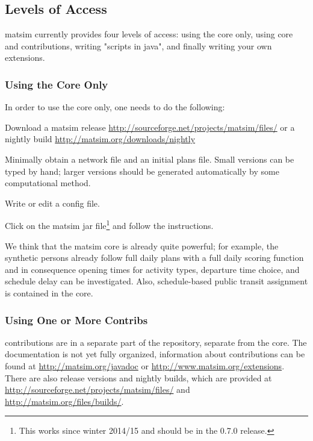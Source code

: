 \subsection{Levels of Access}
\label{sec:levels-of-access}
\gls{matsim} currently provides four levels of access: using the core only, using core and \glspl{contribution}, writing "scripts in \gls{java}", and finally writing your own \glspl{extension}.

\subsubsection{Using the Core Only}
\label{sec:using-core-only}
In order to use the core only, one needs to do the following:
\begin{compactitem}
\item Download a \gls{matsim} release \url{http://sourceforge.net/projects/matsim/files/} or a nightly build \url{http://matsim.org/downloads/nightly} %
\item Minimally obtain a network file and an initial plans file.  Small versions can be typed by hand; larger versions should be generated automatically by some computational method.
\item Write or edit a config file.
\item Click on the \gls{matsim} jar file\footnote{This works since winter 2014/15 and should be in the 0.7.0 release.} and follow the instructions. 
\end{compactitem}
We think that the \gls{matsim} core is already quite powerful; for example, the synthetic persons already follow full daily plans with a full daily scoring function and in consequence opening times for activity types, departure time choice, and schedule delay can be investigated. Also, schedule-based public transit assignment is contained in the core.

\subsubsection{Using One or More Contribs}
\label{sec:using-contribs}
\Glspl{contribution} are in a separate part of the repository, separate from the core.  The documentation is not yet fully organized, information about \glspl{contribution} can be found at \url{http://matsim.org/javadoc} or \url{http://www.matsim.org/extensions}. There are also release versions and nightly builds, which are provided at \url{http://sourceforge.net/projects/matsim/files/} and \url{http://matsim.org/files/builds/}. %

